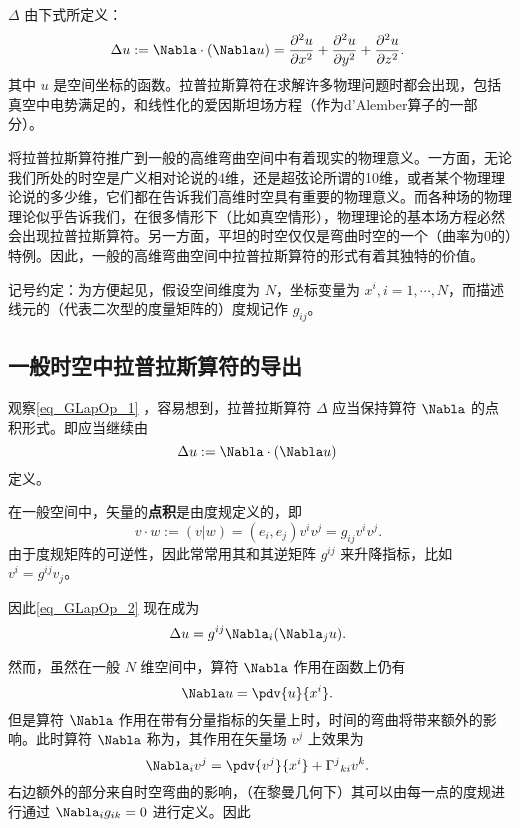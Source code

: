 
 $\Delta$ 由下式所定义：
\begin{equation}\label{eq_GLapOp_1}
\Delta u:=\Nabla\cdot (\Nabla u)=\frac{\partial^{2}{u}}{\partial{x}^{2}} + \frac{\partial^{2}{u}}{\partial{y}^{2}} + \frac{\partial^{2}{u}}{\partial{z}^{2}}.~
\end{equation}
其中 $u$ 是空间坐标的函数。拉普拉斯算符在求解许多物理问题时都会出现，包括真空中电势满足的，和线性化的爱因斯坦场方程（作为d'Alember算子的一部分）。

将拉普拉斯算符推广到一般的高维弯曲空间中有着现实的物理意义。一方面，无论我们所处的时空是广义相对论说的4维，还是超弦论所谓的10维，或者某个物理理论说的多少维，它们都在告诉我们高维时空具有重要的物理意义。而各种场的物理理论似乎告诉我们，在很多情形下（比如真空情形），物理理论的基本场方程必然会出现拉普拉斯算符。另一方面，平坦的时空仅仅是弯曲时空的一个（曲率为0的）特例。因此，一般的高维弯曲空间中拉普拉斯算符的形式有着其独特的价值。

记号约定：为方便起见，假设空间维度为 $N$，坐标变量为 $x^i,i=1,\cdots,N$，而描述线元的（代表二次型的度量矩阵的）度规记作 $g_{ij}$。

\subsection{一般时空中拉普拉斯算符的导出}
观察\autoref{eq_GLapOp_1} ，容易想到，拉普拉斯算符 $\Delta$ 应当保持算符 $\Nabla$ 的点积形式。即应当继续由
\begin{equation}\label{eq_GLapOp_2}
\Delta u:=\Nabla\cdot (\Nabla u)~
\end{equation}
定义。

在一般空间中，矢量的\textbf{点积}是由度规定义的，即
\begin{equation}
v\cdot w:=(v|w)=(e_i,e_j)v^iv^j=g_{ij}v^iv^j.~
\end{equation}
由于度规矩阵的可逆性，因此常常用其和其逆矩阵 $g^{ij}$ 来升降指标，比如 $v^i=g^{ij}v_j$。

因此\autoref{eq_GLapOp_2} 现在成为
\begin{equation}\label{eq_GLapOp_3}
\Delta u=g^{ij}\Nabla_i(\Nabla_j u).~
\end{equation}

然而，虽然在一般 $N$ 维空间中，算符 $\Nabla$ 作用在函数上仍有
\begin{equation}
\Nabla u=\pdv{u}{x^i}.~
\end{equation}
但是算符 $\Nabla$ 作用在带有分量指标的矢量上时，时间的弯曲将带来额外的影响。此时算符 $\Nabla$ 称为，其作用在矢量场 $v^j$ 上效果为
\begin{equation}
\Nabla_i v^j= \pdv{v^j}{x^i}+{\Gamma^{j}}_{ki}v^k.~
\end{equation}
右边额外的部分来自时空弯曲的影响，（在黎曼几何下）其可以由每一点的度规进行通过 $\Nabla_i g_{ik}=0$ 进行定义。因此

